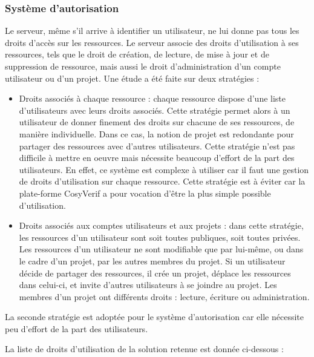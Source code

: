 \documentclass{report}
\begin{document}
\subsubsection{Système d'autorisation}
Le serveur, même s'il arrive à identifier un utilisateur, ne lui donne pas
tous les droits d'accès sur les ressources.
Le serveur associe des droits d'utilisation à ses ressources, tels que le droit de création, de lecture, de mise à jour et de 
suppression de ressource, mais aussi le droit d'administration d'un compte utilisateur ou d'un projet. Une étude a été faite
sur deux stratégies :
\begin{itemize}
\item Droits associés à chaque ressource : chaque ressource dispose d'une
  liste d'utilisateurs avec leurs droits associés. Cette stratégie permet
  alors à un utilisateur de donner finement des droits sur chacune de ses
  ressources, de manière individuelle.
  Dans ce cas, la notion de projet est redondante pour partager des ressources avec d'autres
utilisateurs. Cette stratégie n'est pas difficile à mettre en oeuvre mais
nécessite beaucoup d'effort de la part 
des utilisateurs. En effet, ce système est complexe à utiliser car il faut une gestion
de droits d'utilisation sur chaque ressource. Cette stratégie est à éviter
car la plate-forme CosyVerif a pour vocation d'être la plus simple possible
d'utilisation.
\item Droits associés aux comptes utilisateurs et aux projets : dans cette stratégie, les ressources d'un utilisateur sont
soit toutes publiques, soit toutes privées.
Les ressources d'un utilisateur ne sont modifiable que par lui-même, ou dans
le cadre d'un projet, par les autres membres du projet.
Si un utilisateur décide de partager des ressources, il crée un projet,
déplace les ressources dans celui-ci, et invite d'autres utilisateurs à se joindre au projet.
Les membres d'un projet ont différents droits : lecture, écriture ou
administration.
\end{itemize} 

La seconde stratégie est adoptée pour le système d'autorisation car elle nécessite peu
d'effort de la part des utilisateurs.


La liste de droits d'utilisation de la solution retenue est donnée
ci-dessous :
\end{document}
